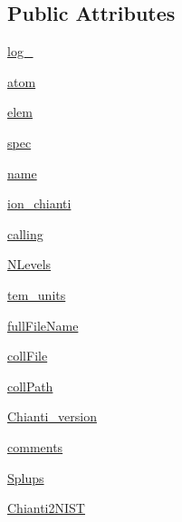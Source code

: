 \subsection*{Public Attributes}
\begin{DoxyCompactItemize}
\item 
\hyperlink{classpyneb_1_1utils_1_1pn__chianti_1_1___coll_chianti_afd87151907f32bc0dc45f0171b61374e}{log\-\_\-}
\item 
\hyperlink{classpyneb_1_1utils_1_1pn__chianti_1_1___coll_chianti_a0c5c7091b1d8a95d9bee2744d713f5c9}{atom}
\item 
\hyperlink{classpyneb_1_1utils_1_1pn__chianti_1_1___coll_chianti_a62e73dc66c7aff7941c5ce94e808c23a}{elem}
\item 
\hyperlink{classpyneb_1_1utils_1_1pn__chianti_1_1___coll_chianti_adaf1b66faf18504ec4b5c8c0b7f6763b}{spec}
\item 
\hyperlink{classpyneb_1_1utils_1_1pn__chianti_1_1___coll_chianti_ab74e6bf80237ddc4109968cedc58c151}{name}
\item 
\hyperlink{classpyneb_1_1utils_1_1pn__chianti_1_1___coll_chianti_afcfd897e5617cc9f3a7239ef78e821ee}{ion\-\_\-chianti}
\item 
\hyperlink{classpyneb_1_1utils_1_1pn__chianti_1_1___coll_chianti_ab25fa7ebe84b603684dee62410c1e34c}{calling}
\item 
\hyperlink{classpyneb_1_1utils_1_1pn__chianti_1_1___coll_chianti_a4d45fe163c2108853ab418386bf4da56}{N\-Levels}
\item 
\hyperlink{classpyneb_1_1utils_1_1pn__chianti_1_1___coll_chianti_a538e48ab1f2ca63dbe55abea69ca2242}{tem\-\_\-units}
\item 
\hyperlink{classpyneb_1_1utils_1_1pn__chianti_1_1___coll_chianti_a6df8c03c050eea50de355d36d398c5b8}{full\-File\-Name}
\item 
\hyperlink{classpyneb_1_1utils_1_1pn__chianti_1_1___coll_chianti_ab1799c18dddda68ec8651caf93c90e40}{coll\-File}
\item 
\hyperlink{classpyneb_1_1utils_1_1pn__chianti_1_1___coll_chianti_adde256ff299a719e21c78ff9aad1b68c}{coll\-Path}
\item 
\hyperlink{classpyneb_1_1utils_1_1pn__chianti_1_1___coll_chianti_a1caebb547c4fc66d6e9136a4009d8010}{Chianti\-\_\-version}
\item 
\hyperlink{classpyneb_1_1utils_1_1pn__chianti_1_1___coll_chianti_a64b8b36116751d566275b722e40bb3a7}{comments}
\item 
\hyperlink{classpyneb_1_1utils_1_1pn__chianti_1_1___coll_chianti_a63c12105b815881336686c9a46aadda2}{Splups}
\item 
\hyperlink{classpyneb_1_1utils_1_1pn__chianti_1_1___coll_chianti_a48e401b4ff0a724d7b4d697b02a59846}{Chianti2\-N\-I\-S\-T}
\end{DoxyCompactItemize}


